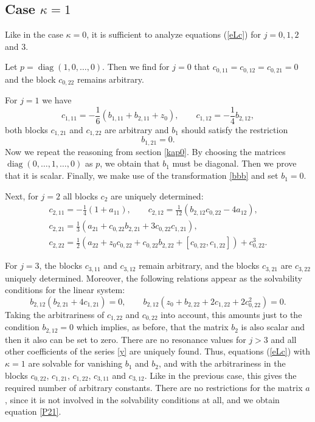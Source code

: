 \documentclass{article}
\theoremstyle{plain}
\theoremstyle{definition}
\DeclareMathOperator{\diag}{diag}
\begin{document}
\subsection{Case $\kappa = 1$}

Like in the case $\kappa=0$, it is sufficient to analyze equations (\ref{eLc}) for $j=0,1,2$ and $3$. 

Let $p=\diag(1,0,\dots,0)$. Then we find for $j=0$ that $c_{0,11}=c_{0,12}=c_{0,21}=0$ and the block $c_{0,22}$ remains arbitrary. 

For $j=1$ we have
\[
 c_{1,11}=-\frac{1}{6}(b_{1,11}+b_{2,11}+z_0),\qquad c_{1,12}=-\frac{1}{4}b_{2,12},
\]
both blocks $c_{1,21}$ and $c_{1,22}$ are arbitrary and $b_1$ should satisfy the restriction
\[
 b_{1,21}=0.
\]
Now we repeat the reasoning from section \ref{kap0}. By choosing the matrices $\diag(0,\dots,1,\dots,0)$ as $p$, we obtain that $b_1$ must be diagonal. Then we prove that it is scalar. Finally, we make use of the transformation \eqref{bbb} and set $b_1=0$.

Next, for $j=2$ all blocks $c_2$ are uniquely determined:
\begin{gather*}
 c_{2,11}=-\frac{1}{4}(1+a_{11}),\qquad
 c_{2,12}=\frac{1}{12}(b_{2,12}c_{0,22}-4a_{12}),\\
 c_{2,21}=\frac{1}{3}(a_{21}+c_{0,22}b_{2,21}+3c_{0,22}c_{1,21}),\\
 c_{2,22}=\frac{1}{2}(a_{22}+z_0c_{0,22}+c_{0,22}b_{2,22}
  +[c_{0,22},c_{1,22}])+c^3_{0,22}.
\end{gather*}

For $j=3$, the blocks $c_{3,11}$ and $c_{3,12}$ remain arbitrary, and the blocks $c_{3,21}$ are $c_{3,22}$ uniquely determined. Moreover, the following relations appear as the solvability conditions for the linear system:
\[
 b_{2,12}(b_{2,21}+4c_{1,21})=0,\qquad b_{2,12}(z_0+b_{2,22}+2c_{1,22}+2c^2_{0,22})=0.
\]
Taking the arbitrariness of $c_{1,22}$ and $c_{0,22}$ into account, this amounts just to the condition $b_{2,12}=0$ which implies, as before, that the matrix $b_2$ is also scalar and then it also can be set to zero. There are no resonance values for $j>3$ and all other coefficients of the series \eqref{y} are uniquely found.  Thus, equations (\ref{eLc}) with $\kappa=1$ are solvable for vanishing $b_1$ and $b_2$, and with the arbitrariness in the blocks $c_{0,22}$, $c_{1,21}$, $c_{1,22}$, $c_{3,11}$ and $c_{3,12}$. Like in the previous case, this gives the required number of arbitrary constants. There are no restrictions for the matrix $a$, since it is not involved in the solvability conditions at all, and we obtain equation \ref{P21}. 
\end{document}
